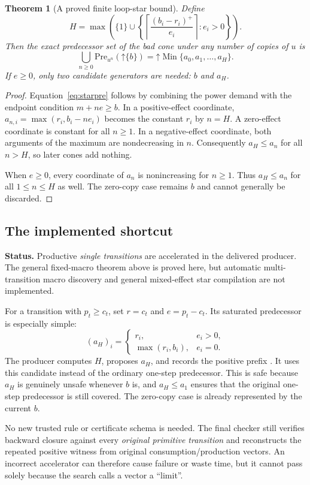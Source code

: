 \documentclass[11pt,a4paper]{article}
\newcommand{\Up}[1]{\mathord{\uparrow}#1}
\newcommand{\Min}{\operatorname{Min}}
\newcommand{\code}[1]{\texttt{\detokenize{#1}}}
\newcommand{\status}[1]{\par\noindent\textbf{Status.} #1\par}
\newtheorem{theorem}{Theorem}[section]
\theoremstyle{definition}
\theoremstyle{remark}
\begin{document}
\begin{theorem}[A proved finite loop-star bound]\label{thm:star}
Define
\[
 H=\max\left(\{1\}\cup\left\{
 \left\lceil\frac{(b_i-r_i)^+}{e_i}\right\rceil:e_i>0
 \right\}\right).
\]
Then the exact predecessor set of the bad cone under any number of copies of $u$ is
\[
 \bigcup_{n\ge0}\mathrm{Pre}_{u^n}(\Up{\{b\}})
 =\Up{\Min\{a_0,a_1,\ldots,a_H\}}.
\]
If $e\ge0$, only two candidate generators are needed: $b$ and $a_H$.
\end{theorem}
\begin{proof}
Equation~\eqref{eq:starpre} follows by combining the power demand with the endpoint condition $m+ne\ge b$. In a positive-effect coordinate, $a_{n,i}=\max(r_i,b_i-ne_i)$ becomes the constant $r_i$ by $n=H$. A zero-effect coordinate is constant for all $n\ge1$. In a negative-effect coordinate, both arguments of the maximum are nondecreasing in $n$. Consequently $a_H\le a_n$ for all $n>H$, so later cones add nothing.

When $e\ge0$, every coordinate of $a_n$ is nonincreasing for $n\ge1$. Thus $a_H\le a_n$ for all $1\le n\le H$ as well. The zero-copy case remains $b$ and cannot generally be discarded.
\end{proof}

\subsection{The implemented shortcut}
\status{Productive \emph{single transitions} are accelerated in the delivered producer. The general fixed-macro theorem above is proved here, but automatic multi-transition macro discovery and general mixed-effect star compilation are not implemented.}
For a transition with $p_t\ge c_t$, set $r=c_t$ and $e=p_t-c_t$. Its saturated predecessor is especially simple:
\[
 (a_H)_i=
 \begin{cases}
 r_i,&e_i>0,\\
 \max(r_i,b_i),&e_i=0.
 \end{cases}
\]
The producer computes $H$, proposes $a_H$, and records the positive prefix \code{repeat(step(t), H)}. It uses this candidate instead of the ordinary one-step predecessor. This is safe because $a_H$ is genuinely unsafe whenever $b$ is, and $a_H\le a_1$ ensures that the original one-step predecessor is still covered. The zero-copy case is already represented by the current $b$.

No new trusted rule or certificate schema is needed. The final checker still verifies backward closure against every \emph{original primitive transition} and reconstructs the repeated positive witness from original consumption/production vectors. An incorrect accelerator can therefore cause failure or waste time, but it cannot pass solely because the search calls a vector a ``limit''.
\end{document}
